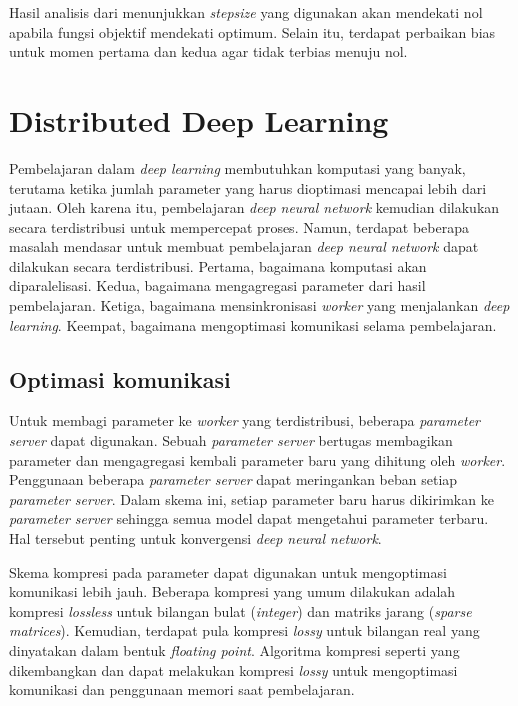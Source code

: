 Hasil analisis dari \textcite{ADAMKingma} menunjukkan \emph{stepsize} yang digunakan akan mendekati nol apabila fungsi objektif mendekati optimum. Selain itu, terdapat perbaikan bias untuk momen pertama dan kedua agar tidak terbias menuju nol.

\section{Distributed Deep Learning}
Pembelajaran dalam \emph{deep learning} membutuhkan komputasi yang banyak, terutama ketika jumlah parameter yang harus dioptimasi mencapai lebih dari jutaan. Oleh karena itu, pembelajaran \emph{deep neural network} kemudian dilakukan secara terdistribusi untuk mempercepat proses. Namun, terdapat beberapa masalah mendasar untuk membuat pembelajaran \emph{deep neural network} dapat dilakukan secara terdistribusi. Pertama, bagaimana komputasi akan diparalelisasi. Kedua, bagaimana mengagregasi parameter dari hasil pembelajaran. Ketiga, bagaimana mensinkronisasi \emph{worker} yang menjalankan \emph{deep learning}. Keempat, bagaimana mengoptimasi komunikasi selama pembelajaran.

\subsection{Optimasi komunikasi}
Untuk membagi parameter ke \emph{worker} yang terdistribusi, beberapa \emph{parameter server} dapat digunakan. Sebuah \emph{parameter server} bertugas membagikan parameter dan mengagregasi kembali parameter baru yang dihitung oleh \emph{worker}. Penggunaan beberapa \emph{parameter server} dapat meringankan beban setiap \emph{parameter server}. Dalam skema ini, setiap parameter baru harus dikirimkan ke \emph{parameter server} sehingga semua model dapat mengetahui parameter terbaru. Hal tersebut penting untuk konvergensi \emph{deep neural network}.

Skema kompresi pada parameter dapat digunakan untuk mengoptimasi komunikasi lebih jauh. Beberapa kompresi yang umum dilakukan adalah kompresi \emph{lossless} untuk bilangan bulat (\emph{integer}) dan matriks jarang (\emph{sparse matrices}). Kemudian, terdapat pula kompresi \emph{lossy} untuk bilangan real yang dinyatakan dalam bentuk \emph{floating point}. Algoritma kompresi seperti yang dikembangkan \textcite{Jin2021Comet} dan \textcite{Horvoth2022Natural} dapat melakukan kompresi \emph{lossy} untuk mengoptimasi komunikasi dan penggunaan memori saat pembelajaran.

